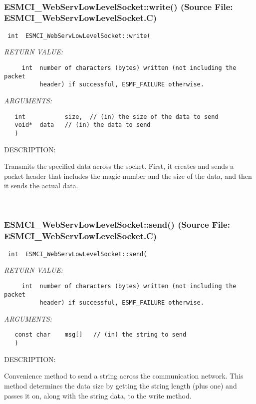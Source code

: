  
\mbox{}\hrulefill\
 
\subsubsection{ESMCI\_WebServLowLevelSocket::write() (Source File: ESMCI\_WebServLowLevelSocket.C)}


  
\begin{verbatim} int  ESMCI_WebServLowLevelSocket::write(\end{verbatim}{\em RETURN VALUE:}
\begin{verbatim}     int  number of characters (bytes) written (not including the packet
          header) if successful, ESMF_FAILURE otherwise.\end{verbatim}{\em ARGUMENTS:}
\begin{verbatim}   int           size,  // (in) the size of the data to send
   void*  data   // (in) the data to send
   )\end{verbatim}
{\sf DESCRIPTION:\\ }


      Transmits the specified data across the socket.  First, it creates and
      sends a packet header that includes the magic number and the size of the
      data, and then it sends the actual data.
   
 
\mbox{}\hrulefill\
 
\subsubsection{ESMCI\_WebServLowLevelSocket::send() (Source File: ESMCI\_WebServLowLevelSocket.C)}


  
\begin{verbatim} int  ESMCI_WebServLowLevelSocket::send(\end{verbatim}{\em RETURN VALUE:}
\begin{verbatim}     int  number of characters (bytes) written (not including the packet
          header) if successful, ESMF_FAILURE otherwise.\end{verbatim}{\em ARGUMENTS:}
\begin{verbatim}   const char    msg[]   // (in) the string to send
   )\end{verbatim}
{\sf DESCRIPTION:\\ }


      Convenience method to send a string across the communication network.
      This method determines the data size by getting the string length (plus
      one) and passes it on, along with the string data, to the write method.
  
\setlength{\parskip}{\oldparskip}
\setlength{\parindent}{\oldparindent}
\setlength{\baselineskip}{\oldbaselineskip}

